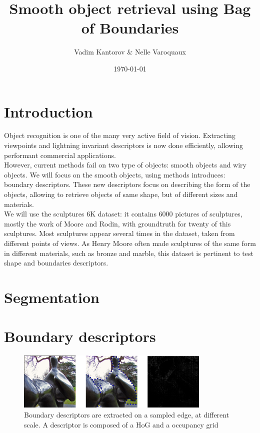 \documentclass{article}
\date{\today}
\title{Smooth object retrieval using Bag of Boundaries}
\author{Vadim Kantorov \& Nelle Varoquaux}
\begin{document}
\maketitle
\begin{abstract}

\end{abstract}

\section{Introduction}
Object recognition is one of the many very active field of vision. Extracting
viewpoints and lightning invariant descriptors is now done efficiently,
allowing performant commercial applications. \\
However, current methods fail on two type of objects: smooth objects and wiry
objects. We will focus on the smooth objects, using methods
\cite{Arandjelovic11} introduces: boundary descriptors. These new descriptors
focus on describing the form of the objects, allowing to retrieve objects
of same shape, but of different sizes and materials. \\
We will use the sculptures 6K dataset: it contains $6000$ pictures of
sculptures, mostly the work of Moore and Rodin, with groundtruth for twenty
of this sculptures. Most sculptures appear several times in the dataset, taken
from different points of views. As Henry Moore often made sculptures of the
same form in different materials, such as bronze and marble, this dataset is
pertinent to test shape and boundaries descriptors.

\section{Segmentation}
\section{Boundary descriptors}

\begin{figure}

\label{boundary-descriptors}
\begin{center}
\includegraphics[width=350px]{images/desc.png}
\end{center}
\caption{Boundary descriptors are extracted on a sampled edge, at different
scale. A descriptor is composed of a HoG and a occupancy grid}
\end{figure}
\end{document}

